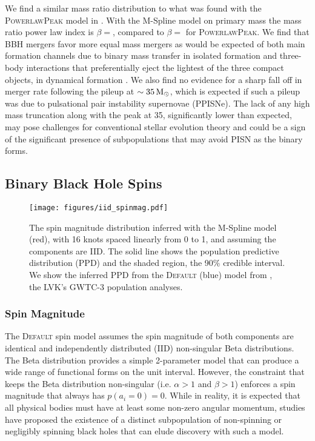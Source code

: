 We find a similar mass ratio distribution to what was found with the \textsc{PowerlawPeak} model in \citet{o3b_astro_dist}. 
With the M-Spline model on primary mass the mass ratio power law index is $\beta = $\result{$\CIPlusMinus{\macros[MSplineIIDCompSpins][beta]}$}, 
compared to $\beta = $\result{$\CIPlusMinus{\macros[PLPeak][beta]}$} for \textsc{PowerlawPeak}. We find that BBH mergers favor more equal mass mergers
as would be expected of both main formation channels due to binary mass transfer in isolated formation and three-body interactions that preferentially eject
the lightest of the three compact objects, in dynamical formation . We also find no evidence for a sharp fall off in merger rate following 
the pileup at $\sim35\,{\rm M}_\odot$, which is expected if such a pileup was due to pulsational pair instability supernovae (PPISNe). The lack of any high mass truncation 
along with the peak at 35\msun, significantly lower than expected, may pose challenges for conventional stellar evolution theory and could be a sign of 
the significant presence of subpopulations that may avoid PISN as the binary forms. 

\subsection{Binary Black Hole Spins} \label{sec:spin_dist}

\begin{figure}
    \begin{centering}    
        \texttt{[image: figures/iid\_spinmag.pdf]}
        \caption{The spin magnitude distribution inferred with the M-Spline model (red), with 16 knots spaced linearly from 0 to 1, and 
        assuming the components are IID. The solid line shows the population predictive distribution (PPD) and the shaded region, the 90\% credible interval. 
        We show the inferred PPD from the \textsc{Default} (blue) model from \citet{o3b_astro_dist}, the LVK's GWTC-3 population analyses.}
        \label{fig:iid_spinmag_dist}
    \end{centering}
\end{figure}

\subsubsection{Spin Magnitude}

The \textsc{Default} spin model assumes the spin magnitude of both components are identical and independently distributed (IID) non-singular Beta distributions. The
Beta distribution provides a simple 2-parameter model that can produce a wide range of functional forms on the unit interval. However, the constraint that keeps 
the Beta distribution non-singular (i.e. $\alpha>1$ and $\beta>1$) enforces a spin magnitude that always has $p(a_i=0) = 0$. While in reality, it is expected that 
all physical bodies must have at least some non-zero angular momentum, studies have proposed the existence of a distinct subpopulation of non-spinning or 
negligibly spinning black holes that can elude discovery with such a model. 

